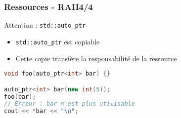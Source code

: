 \documentclass[C++.tex]{subfiles}
\begin{document}
\begin{frame}[fragile]
	\frametitle{Ressources - RAII\titlehfill{}4/4}
	\begin{alertblock}{Attention : \lstinline|std::auto_ptr|}
		\begin{itemize}
			\item \lstinline|std::auto_ptr| est copiable
			\item Cette copie transfère la responsabilité de la ressource
		\end{itemize}
	\end{alertblock}

	\begin{lstlisting}[language=C++]
void foo(auto_ptr<int> bar) {}

auto_ptr<int> bar(new int(5));
foo(bar);
// Erreur : bar n'est plus utilisable
cout << *bar << "\n";\end{lstlisting}


\end{frame}
\end{document}
